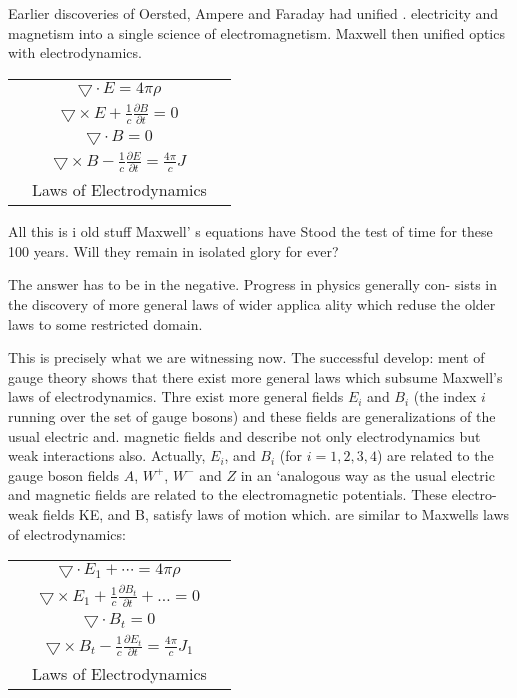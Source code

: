 Earlier discoveries of Oersted, Ampere and Faraday had unified .
electricity and magnetism into a single science of electromagnetism. Maxwell then unified optics with electrodynamics. 

\begin{center}
\begin{tabular}{|ccc|}
\hline
& $\bigtriangledown \cdot E = 4 \pi \rho$ &\\[0.2cm]
& $\bigtriangledown \times E + \frac{1}{c} \frac{\partial B}{\partial t} = 0$&\\[0.2cm]
& $\bigtriangledown \cdot B =0$ &\\[0.2cm]
& $\bigtriangledown \times B - \frac{1}{c} \frac{\partial E}{\partial t} = \frac{4\pi}{c}J$&\\[0.2cm]
& {\rm Laws of Electrodynamics  } & \\[0.2cm]
\hline
\end{tabular}
\end{center}

All this is i old stuff Maxwell’ s equations have Stood the test of time
for these 100 years. Will they remain in isolated glory for ever? 

The answer has to be in the negative. Progress in physics generally con- sists in the discovery of more general laws of wider applica ality which
reduse the older laws to some restricted domain. 

This is precisely what we are witnessing now. The successful develop: ment of gauge theory shows that there exist more general laws which subsume Maxwell’s laws of electrodynamics. Thre exist more general 
fields $E_{i}$ and $B_{i}$ (the index  $i$ running over the set of gauge bosons) and these fields are generalizations of the usual electric and. magnetic fields and describe not only electrodynamics but weak interactions also. Actually,
$E_{i}$, and $B_{i}$ (for $i= 1, 2,3, 4$) are related to the gauge boson fields $A$, $W^{+}$, $W^{-}$ and $Z$ in an ‘analogous way as the usual electric and magnetic
fields are related to the electromagnetic potentials. These electro-weak
fields KE, and B, satisfy laws of motion which. are similar to Maxwells laws of electrodynamics: 
\begin{center}
\begin{tabular}{|ccc|}
\hline
& $\bigtriangledown \cdot E_{1}+ \cdots = 4 \pi \rho$ &\\[0.2cm]
& $\bigtriangledown \times E_{1} + \frac{1}{c} \frac{\partial B_{t}}{\partial t}+ \ldots = 0$&\\[0.2cm]
& $\bigtriangledown \cdot B_{t} =0$ &\\[0.2cm]
& $\bigtriangledown \times B_{t} - \frac{1}{c} \frac{\partial E_{t}}{\partial t} = \frac{4\pi}{c}J_{1}$&\\[0.2cm]
& {\rm Laws of Electrodynamics  } & \\[0.2cm]
\hline
\end{tabular}
\end{center}

